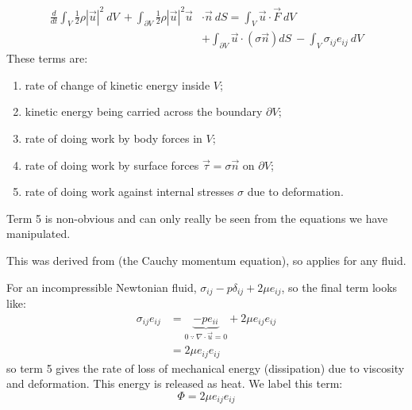 \documentclass[../Main.tex]{subfiles}
\begin{document}
\begin{align*}
    \frac{d}{dt} \int_V \frac12 \rho |\vec{u}|^2~dV~+ \int_{\partial V} \frac12 \rho |\vec{u}|^2 \vec{u} &\cdot \vec{n}~dS = \int_V \vec{u} \cdot \vec{F}~dV \\
    &+ \int_{\partial V} \vec{u} \cdot (\sigma \vec{n}) dS~- \int_V \sigma_{ij} e_{ij}~dV
\end{align*}
These terms are:
\begin{enumerate}
    \item rate of change of kinetic energy inside $V$;
    \item kinetic energy being carried across the boundary $\partial V$;
    \item rate of doing work by body forces in $V$;
    \item rate of doing work by surface forces $\vec{\tau} = \sigma\vec{n}$ on $\partial V$;
    \item rate of doing work against internal stresses $\sigma$ due to deformation.
\end{enumerate}
\begin{remarks}
    \item Term 5 is non-obvious and can only really be seen from the equations we have manipulated.
    \item This was derived from  (the Cauchy momentum equation), so applies for any fluid.
\end{remarks}
For an incompressible Newtonian fluid, $\sigma_{ij} - p \delta_{ij} + 2 \mu e_{ij}$, so the final term looks like:
\begin{align*}
    \sigma_{ij} e_{ij} &= \underbrace{-p e_{ii}}_{0~\because~\nabla \cdot \vec{u} = 0} + 2 \mu e_{ij} e_{ij} \\
    &= 2\mu e_{ij}e_{ij}
\end{align*}
so term 5 gives the rate of loss of mechanical energy (dissipation) due to viscosity and deformation. This energy is released as heat. We label this term:
\begin{equation*}
    \Phi = 2\mu e_{ij}e_{ij}
\end{equation*}
\end{document}
